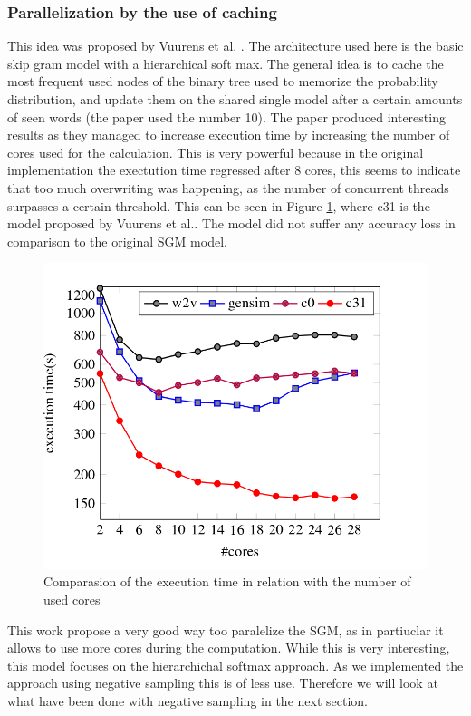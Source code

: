 {\subsubsection{Parallelization by the use of caching}
This idea was proposed by Vuurens et al. \cite{efficient}. The architecture used here is the basic skip gram model with a hierarchical soft max.  The general idea is to cache the most frequent used nodes of the binary tree used to memorize the probability distribution, and update them on the shared single model after a certain amounts of seen words (the paper used the number 10). The paper produced interesting results as they managed to increase execution time by increasing the number of cores used for the calculation. This is very powerful because in the original implementation the exectution time regressed after 8 cores, this seems to indicate that too much overwriting was happening, as the number of concurrent threads surpasses a certain threshold. This can be seen in Figure \ref{fig:efficient}, where c31 is the model proposed by Vuurens et al.\cite{efficient}. The model did not suffer any accuracy loss in comparison to the original SGM model. 
\begin{figure}[ht]
    \centering
			\includegraphics[scale=0.3]{images/cachingEfficiency.png} 
    \caption{Comparasion of the execution time in relation with the number of used cores \cite{efficient}}
    \label{fig:efficient}
\end{figure}
This work propose a very good way too paralelize the SGM, as in partiuclar it allows to use more cores during the computation. While this is very interesting, this model focuses on the hierarchichal softmax approach. As we implemented the approach using negative sampling this is of less use. Therefore we will look at what have been done with negative sampling in the next section.

}
